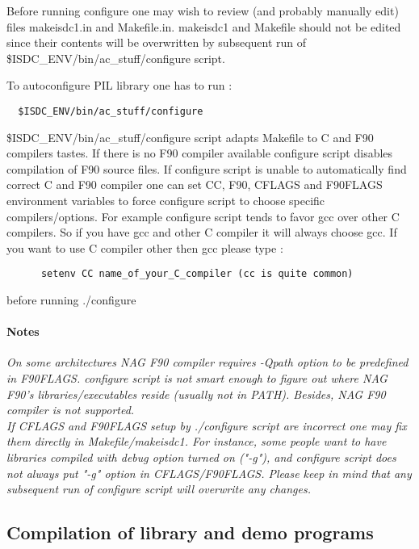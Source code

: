Before  running  configure one may wish to review (and probably manually
edit) files makeisdc1.in and Makefile.in. makeisdc1 and Makefile
should not be edited since their contents will be overwritten by subsequent
run of \${ISDC\_ENV}/bin/ac\_stuff/configure script.

To autoconfigure PIL library one has to run :

\begin{verbatim}
  $ISDC_ENV/bin/ac_stuff/configure
\end{verbatim}

\${ISDC\_ENV}/bin/ac\_stuff/configure script adapts Makefile to C
and F90 compilers tastes. If there is no F90 compiler available configure
script disables compilation of F90 source files. If configure script is 
unable to automatically find correct C and F90 compiler one can set CC, F90,
CFLAGS and F90FLAGS environment variables to force configure script to
choose specific compilers/options. For example configure script tends to 
favor gcc over other C compilers. So if you have gcc and other C
compiler it will always choose gcc. If you want to use C compiler other then
gcc please type : 

\begin{verbatim}
      setenv CC name_of_your_C_compiler (cc is quite common)
\end{verbatim}

before running ./configure 

\paragraph{Notes\\}
{\it
On some architectures NAG F90 compiler requires -Qpath option to be
predefined in F90FLAGS. configure script is not smart enough
to figure out where NAG F90's libraries/executables reside (usually
not in PATH). Besides, NAG F90 compiler is not supported.\\
If CFLAGS and F90FLAGS setup by ./configure script are incorrect one 
may fix them directly in Makefile/makeisdc1. For instance, some people
want to have libraries compiled with debug option turned on ("-g"), 
and configure script does not always put "-g" option in CFLAGS/F90FLAGS.
Please keep in mind that any subsequent run of configure script will
overwrite any changes.
}

\subsection{Compilation of library and demo programs}

